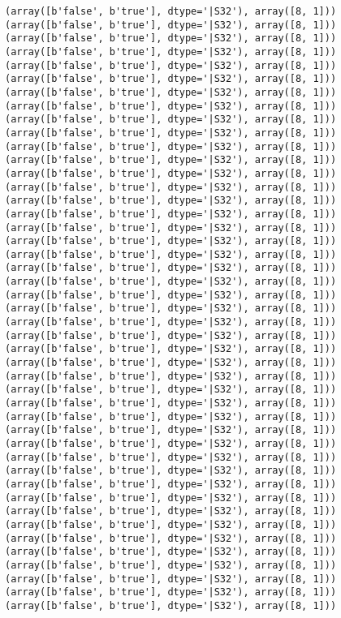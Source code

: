 \documentclass[11pt]{article}
\begin{document}
\begin{Verbatim}[commandchars=\\\{\}]
(array([b'false', b'true'], dtype='|S32'), array([8, 1]))
(array([b'false', b'true'], dtype='|S32'), array([8, 1]))
(array([b'false', b'true'], dtype='|S32'), array([8, 1]))
(array([b'false', b'true'], dtype='|S32'), array([8, 1]))
(array([b'false', b'true'], dtype='|S32'), array([8, 1]))
(array([b'false', b'true'], dtype='|S32'), array([8, 1]))
(array([b'false', b'true'], dtype='|S32'), array([8, 1]))
(array([b'false', b'true'], dtype='|S32'), array([8, 1]))
(array([b'false', b'true'], dtype='|S32'), array([8, 1]))
(array([b'false', b'true'], dtype='|S32'), array([8, 1]))
(array([b'false', b'true'], dtype='|S32'), array([8, 1]))
(array([b'false', b'true'], dtype='|S32'), array([8, 1]))
(array([b'false', b'true'], dtype='|S32'), array([8, 1]))
(array([b'false', b'true'], dtype='|S32'), array([8, 1]))
(array([b'false', b'true'], dtype='|S32'), array([8, 1]))
(array([b'false', b'true'], dtype='|S32'), array([8, 1]))
(array([b'false', b'true'], dtype='|S32'), array([8, 1]))
(array([b'false', b'true'], dtype='|S32'), array([8, 1]))
(array([b'false', b'true'], dtype='|S32'), array([8, 1]))
(array([b'false', b'true'], dtype='|S32'), array([8, 1]))
(array([b'false', b'true'], dtype='|S32'), array([8, 1]))
(array([b'false', b'true'], dtype='|S32'), array([8, 1]))
(array([b'false', b'true'], dtype='|S32'), array([8, 1]))
(array([b'false', b'true'], dtype='|S32'), array([8, 1]))
(array([b'false', b'true'], dtype='|S32'), array([8, 1]))
(array([b'false', b'true'], dtype='|S32'), array([8, 1]))
(array([b'false', b'true'], dtype='|S32'), array([8, 1]))
(array([b'false', b'true'], dtype='|S32'), array([8, 1]))
(array([b'false', b'true'], dtype='|S32'), array([8, 1]))
(array([b'false', b'true'], dtype='|S32'), array([8, 1]))
(array([b'false', b'true'], dtype='|S32'), array([8, 1]))
(array([b'false', b'true'], dtype='|S32'), array([8, 1]))
(array([b'false', b'true'], dtype='|S32'), array([8, 1]))
(array([b'false', b'true'], dtype='|S32'), array([8, 1]))
(array([b'false', b'true'], dtype='|S32'), array([8, 1]))
(array([b'false', b'true'], dtype='|S32'), array([8, 1]))
(array([b'false', b'true'], dtype='|S32'), array([8, 1]))
(array([b'false', b'true'], dtype='|S32'), array([8, 1]))
(array([b'false', b'true'], dtype='|S32'), array([8, 1]))
(array([b'false', b'true'], dtype='|S32'), array([8, 1]))
(array([b'false', b'true'], dtype='|S32'), array([8, 1]))
(array([b'false', b'true'], dtype='|S32'), array([8, 1]))
(array([b'false', b'true'], dtype='|S32'), array([8, 1]))
(array([b'false', b'true'], dtype='|S32'), array([8, 1]))
(array([b'false', b'true'], dtype='|S32'), array([8, 1]))

\end{Verbatim}
\end{document}
